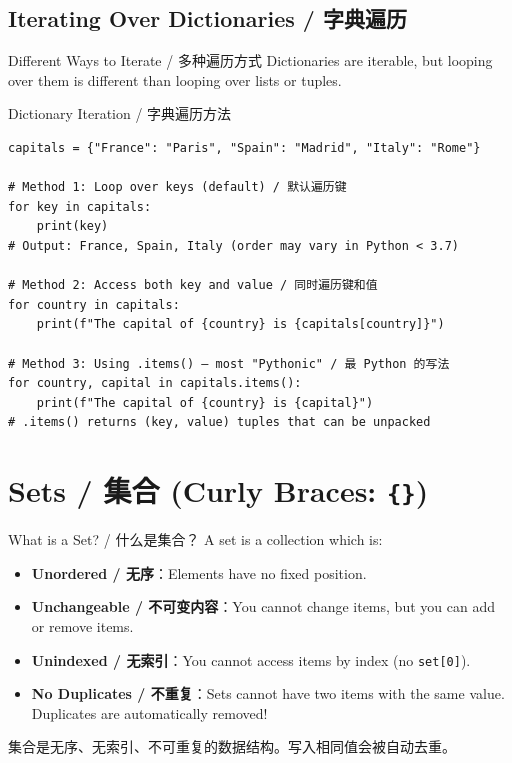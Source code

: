 \documentclass[11pt,a4paper]{report}
\let\oldtexttt\texttt
\renewcommand{\texttt}[1]{\textcolor{mainblue}{\oldtexttt{#1}}}
\begin{document}
\subsection{Iterating Over Dictionaries / 字典遍历}

\begin{concept}{Different Ways to Iterate / 多种遍历方式}
    Dictionaries are iterable, but looping over them is different than looping over lists or tuples.
\end{concept}

\begin{examplebox}{Dictionary Iteration / 字典遍历方法}
\begin{lstlisting}
capitals = {"France": "Paris", "Spain": "Madrid", "Italy": "Rome"}

# Method 1: Loop over keys (default) / 默认遍历键
for key in capitals:
    print(key)
# Output: France, Spain, Italy (order may vary in Python < 3.7)

# Method 2: Access both key and value / 同时遍历键和值
for country in capitals:
    print(f"The capital of {country} is {capitals[country]}")

# Method 3: Using .items() — most "Pythonic" / 最 Python 的写法
for country, capital in capitals.items():
    print(f"The capital of {country} is {capital}")
# .items() returns (key, value) tuples that can be unpacked
\end{lstlisting}
\end{examplebox}

\section{Sets / 集合 (Curly Braces: \texttt{\{\}})}

\begin{concept}{What is a Set? / 什么是集合？}
    A set is a collection which is:
    \begin{itemize}[itemsep=0.3em]
        \item \textbf{Unordered / 无序}：Elements have no fixed position.
        \item \textbf{Unchangeable / 不可变内容}：You cannot change items, but you can add or remove items.
        \item \textbf{Unindexed / 无索引}：You cannot access items by index (no \texttt{set[0]}).
        \item \textbf{No Duplicates / 不重复}：Sets cannot have two items with the same value. Duplicates are automatically removed!
    \end{itemize}
    集合是无序、无索引、不可重复的数据结构。写入相同值会被自动去重。
\end{concept}
\end{document}
